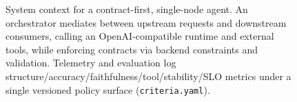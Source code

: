 \begin{figure}[t]
\caption{System context for a contract-first, single-node agent.
An orchestrator mediates between upstream requests and downstream consumers, calling an OpenAI-compatible runtime and external tools, while enforcing contracts via backend constraints and validation.
Telemetry and evaluation log structure/accuracy/faithfulness/tool/stability/SLO metrics under a single versioned policy surface (\texttt{criteria.yaml}).}
\label{fig:agent-context}
\end{figure}

